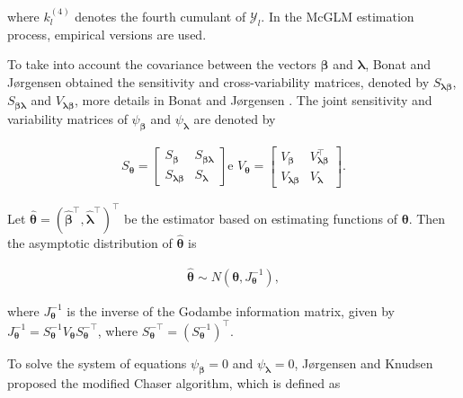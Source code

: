 \documentclass[Review,sagev,times, doublespace]{sagej}
\begin{document}
\noindent where $k_{l}^{(4)}$ denotes the fourth cumulant of $\mathcal{Y}_{l}$. In the McGLM estimation process, empirical versions are used.

To take into account the covariance between the vectors $\boldsymbol{\beta}$ and $\boldsymbol{\lambda}$, Bonat and Jørgensen \cite{Bonat16} obtained the sensitivity and cross-variability matrices, denoted by $S_{\boldsymbol{ \lambda \beta}}$, $S_{\boldsymbol{\beta \lambda}}$ and $V_{\boldsymbol{\lambda \beta}}$, more details in Bonat and Jørgensen \cite{Bonat16}. The joint sensitivity and variability matrices of $\psi_{\boldsymbol{\beta}}$ and $\psi_{\boldsymbol{\lambda}}$ are denoted by

$$
  \begin{aligned}
    S_{\boldsymbol{\theta}} = \begin{bmatrix}
      S_{\boldsymbol{\beta}} & S_{\boldsymbol{\beta\lambda}} \\ 
      S_{\boldsymbol{\lambda\beta}} & S_{\boldsymbol{\lambda}} 
      \end{bmatrix} \text{e } V_{\boldsymbol{\theta}} = \begin{bmatrix}
      V_{\boldsymbol{\beta}} & V^{\top}_{\boldsymbol{\lambda\beta}} \\ 
      V_{\boldsymbol{\lambda\beta}} & V_{\boldsymbol{\lambda}} 
    \end{bmatrix}.
  \end{aligned}
$$

Let $\boldsymbol{\hat{\theta}} = (\boldsymbol{\hat{\beta}^{\top}}, \boldsymbol{\hat{\lambda}^{\top}})^{\top }$ be the estimator based on estimating functions of $\boldsymbol{\theta}$. Then the asymptotic distribution of $\boldsymbol{\hat{\theta}}$ is

$$
  \begin{aligned}
    \boldsymbol{\hat{\theta}} \sim N(\boldsymbol{\theta}, J_{\boldsymbol{\theta}}^{-1}),
  \end{aligned}
$$

\noindent where $J_{\boldsymbol{\theta}}^{-1}$ is the inverse of the Godambe information matrix, given by $J_{\boldsymbol{\theta}}^{-1} = S_{ \boldsymbol{\theta}}^{-1} V_{\boldsymbol{\theta}} S_{\boldsymbol{\theta}}^{-\top}$, where $S_{\boldsymbol{\theta}} ^{-\top} = (S_{\boldsymbol{\theta}}^{-1})^{\top}.$

To solve the system of equations $\psi_{\boldsymbol{\beta}} = 0$ and $\psi_{\boldsymbol{\lambda}} = 0$, Jørgensen and Knudsen \cite{jorg04} proposed the modified Chaser algorithm, which is defined as
\end{document}
